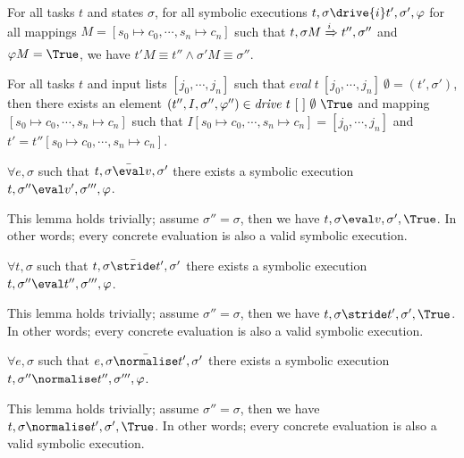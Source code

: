 \begin{lemma}
  \label{lem:sounddrive}

  For all tasks $t$ and states $\sigma$,
  for all symbolic executions $t,\sigma\drive{i} t',\sigma',\phi$
  for all mappings $M=[s_0\mapsto c_0,\cdots,s_n\mapsto c_n]$
  such that $t,\sigma M \xRightarrow[]{i} t'',\sigma''$ and $\phi M = \True$,
  we have $t'M \equiv t'' \wedge \sigma' M \equiv \sigma''$.
\end{lemma}


\begin{theorem}
For all tasks $t$ and input lists $[j_0,\cdots,j_n]$ such that $\mathit{eval}\ t\ [j_0,\cdots,j_n]\ \emptyset = (t',\sigma')$,
then there exists an element $(t'',I,\sigma'',\phi'')\in \mathit{drive}\ t\ [\ ]\ \emptyset\ \True$ and mapping $[s_0\mapsto c_0,\cdots,s_n\mapsto c_n]$ such that
$I[s_0\mapsto c_0,\cdots,s_n\mapsto c_n]=[j_0,\cdots,j_n]$ and $t'=t''[s_0\mapsto c_0,\cdots,s_n\mapsto c_n]$.
  \label{thm:complete}
\end{theorem}


\begin{lemma}
  $\forall e,\sigma$ such that $t,\sigma \bar{\eval}v,\sigma'$
  there exists a symbolic execution $t,\sigma''\eval v',\sigma''',\phi$.
\end{lemma}

This lemma holds trivially; assume $\sigma''=\sigma$, then we have $t,\sigma\eval v,\sigma',\True$. In other words; every concrete evaluation is also a valid symbolic execution.

\begin{lemma}
  $\forall t,\sigma$ such that $t,\sigma \bar{\stride}t',\sigma'$
  there exists a symbolic execution $t,\sigma''\eval t'',\sigma''',\phi$.
\end{lemma}

This lemma holds trivially; assume $\sigma''=\sigma$, then we have $t,\sigma\stride t',\sigma',\True$. In other words; every concrete evaluation is also a valid symbolic execution.

\begin{lemma}
  $\forall e,\sigma$ such that $e,\sigma \bar{\normalise}t',\sigma'$
  there exists a symbolic execution $t,\sigma''\normalise t'',\sigma''',\phi$.
\end{lemma}

This lemma holds trivially; assume $\sigma''=\sigma$, then we have $t,\sigma\normalise t',\sigma',\True$. In other words; every concrete evaluation is also a valid symbolic execution.

